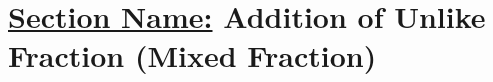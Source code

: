 \documentclass[../main.tex]{subfiles}
\begin{document}
    \section*{\underline{Section Name:} Addition of Unlike Fraction (Mixed Fraction)}
        \begin{multicols}{2}
            \noindent{} \\[1.5cm]
             \\[1.5cm]
             \\[1.5cm]
             \\[1.5cm]
             \\[1.5cm]
             \\[1.5cm]
             \\[1.5cm]
             \\[1.5cm]
             \\[1.5cm]
             \\[1.5cm]
        \end{multicols}
\end{document}
